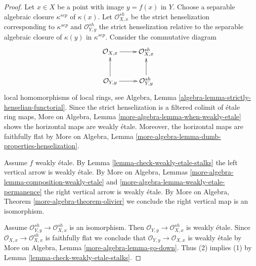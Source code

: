 \documentclass[10pt,a4paper]{amsart}
\theoremstyle{plain}
\theoremstyle{definition}
\theoremstyle{remark}
\numberwithin{equation}{subsection}
\begin{document}
\begin{proof}
Let $x \in X$ be a point with image $y = f(x)$ in $Y$.
Choose a separable algebraic closure $\kappa^{sep}$ of $\kappa(x)$.
Let $\mathcal{O}_{X, x}^{sh}$ be the strict henselization
corresponding to $\kappa^{sep}$ and $\mathcal{O}_{Y, y}^{sh}$
the strict henselization relative to the separable algebraic
closure of $\kappa(y)$ in $\kappa^{sep}$.
Consider the commutative diagram
$$
\xymatrix{
\mathcal{O}_{X, x} \ar[r] & \mathcal{O}_{X, x}^{sh} \\
\mathcal{O}_{Y, y} \ar[u] \ar[r] & \mathcal{O}_{Y, y}^{sh} \ar[u]
}
$$
local homomorphisms of local rings, see
Algebra, Lemma \ref{algebra-lemma-strictly-henselian-functorial}.
Since the strict henselization is a filtered colimit of \'etale
ring maps, More on Algebra, Lemma \ref{more-algebra-lemma-when-weakly-etale}
shows the horizontal maps are weakly \'etale.
Moreover, the horizontal maps are faithfully flat by
More on Algebra, Lemma \ref{more-algebra-lemma-dumb-properties-henselization}.

\medskip\noindent
Assume $f$ weakly \'etale. By Lemma \ref{lemma-check-weakly-etale-stalks}
the left vertical arrow is weakly \'etale. By
More on Algebra, Lemmas \ref{more-algebra-lemma-composition-weakly-etale} and
\ref{more-algebra-lemma-weakly-etale-permanence}
the right vertical arrow is weakly \'etale. By
More on Algebra, Theorem \ref{more-algebra-theorem-olivier}
we conclude the right vertical map is an isomorphism.

\medskip\noindent
Assume $\mathcal{O}_{Y, y}^{sh} \to \mathcal{O}_{X, x}^{sh}$ is an isomorphism.
Then $\mathcal{O}_{Y, y} \to \mathcal{O}_{X, x}^{sh}$ is weakly \'etale.
Since $\mathcal{O}_{X, x} \to \mathcal{O}_{X, x}^{sh}$ is faithfully
flat we conclude that $\mathcal{O}_{Y, y} \to \mathcal{O}_{X, x}$
is weakly \'etale by
More on Algebra, Lemma \ref{more-algebra-lemma-go-down}.
Thus (2) implies (1) by Lemma \ref{lemma-check-weakly-etale-stalks}.
\end{proof}
\end{document}
